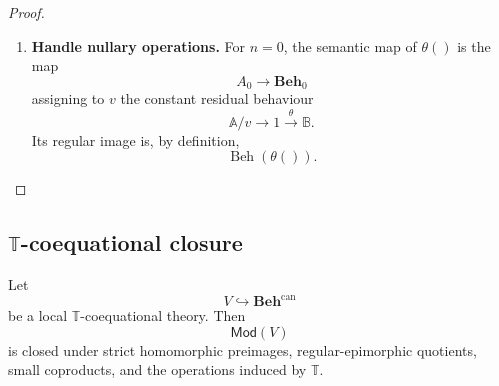 \begin{proof}
\begin{enumerate}
        \item \textbf{Handle nullary operations.}
        For \(n=0\), the semantic map of \(\theta()\) is the map
        \[
            A_0\to\mathbf{Beh}_0
        \]
        assigning to \(v\) the constant residual behaviour
        \[
            \mathbb A/v\to 1\xrightarrow{\theta}\mathbb B.
        \]
        Its regular image is, by definition,
        \[
            \operatorname{Beh}(\theta()).
        \]
    \end{enumerate}
\end{proof}

\subsection{\texorpdfstring{\(\mathbb T\)}{T}-coequational closure}
\label{subsec:T-coequational-closure}

\begin{theorem}
\label{thm:T-coequational-closure}
    Let
    \[
        V\hookrightarrow\mathbf{Beh}^{\mathrm{can}}
    \]
    be a local \(\mathbb T\)-coequational theory. Then
    \[
        \mathsf{Mod}(V)
    \]
    is closed under strict homomorphic preimages, regular-epimorphic quotients,
    small coproducts, and the operations induced by \(\mathbb T\).
\end{theorem}

